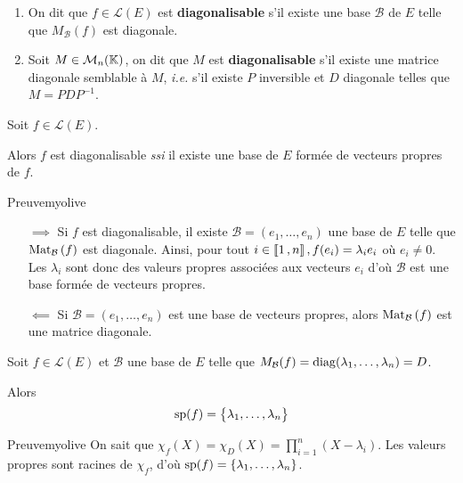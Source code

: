     \begin{defi}{}{}
        \begin{enumerate}[label= \textcolor{myyellow}{\arabic*.}]
            \item On dit que $f \in \mathcal{L}(E)$ est \textbf{diagonalisable} s’il existe une base $\mathcal{B}$ de $E$ telle que $M_{\mathcal{B}}(f)$ est diagonale.
            \item Soit $M \in \mk{n}$, on dit que $M$ est \textbf{diagonalisable} s’il existe une matrice diagonale semblable à $M$, \textit{i.e.} s’il existe $P$ inversible et $D$ diagonale telles que $M = P D P^{-1}$.
        \end{enumerate}
    \end{defi}

    \begin{prop}{}{}
        Soit $f \in \mathcal{L}(E)$.

        Alors $f$ est diagonalisable \textit{ssi} il existe une base de $E$ formée de vecteurs propres de $f$.
    \end{prop}

    \begin{demo}{Preuve}{myolive}
        \begin{itemize}
            \item[$\implies$] Si $f$ est diagonalisable, il existe $\mathcal{B} = (e_1,\ldots,e_n)$ une base de $E$ telle que $\mat{\mathcal{B}}{f}$ est diagonale. Ainsi, pour tout $i \in \intervalleEntier{1}{n}, f(e_i) = \lambda_i e_i$ où $e_i \neq 0$. Les $\lambda_i$ sont donc des valeurs propres associées aux vecteurs $e_i$ d’où $\mathcal{B}$ est une base formée de vecteurs propres.
            \item[$\impliedby$] Si $\mathcal{B} = (e_1,\ldots,e_n)$ est une base de vecteurs propres, alors $\mat{\mathcal{B}}{f}$ est une matrice diagonale.
        \end{itemize}
    \end{demo}

    \begin{prop}{}{}
        Soit $f \in \mathcal{L}(E)$ et $\mathcal{B}$ une base de $E$ telle que $M_{\mathcal{B}}(f) = \diag(\lambda_1, \ldots, \lambda_n) = D$.

        Alors \[ \sp(f) = \big\{ \lambda_1,\ldots,\lambda_n \big\} \]
    \end{prop}

    \begin{demo}{Preuve}{myolive}
        On sait que $\chi_f(X) = \chi_D(X) = \prod_{i = 1}^n (X - \lambda_i)$. Les valeurs propres sont racines de $\chi_f$, d’où $\sp(f) = \left\{\lambda_1, \ldots, \lambda_n\right\}$.
    \end{demo}

